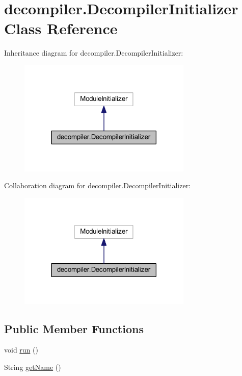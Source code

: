 \hypertarget{classdecompiler_1_1_decompiler_initializer}{}\section{decompiler.\+Decompiler\+Initializer Class Reference}
\label{classdecompiler_1_1_decompiler_initializer}


Inheritance diagram for decompiler.\+Decompiler\+Initializer\+:
\nopagebreak
\begin{figure}[H]
\begin{center}
\leavevmode
\includegraphics[width=234pt]{classdecompiler_1_1_decompiler_initializer__inherit__graph}
\end{center}
\end{figure}


Collaboration diagram for decompiler.\+Decompiler\+Initializer\+:
\nopagebreak
\begin{figure}[H]
\begin{center}
\leavevmode
\includegraphics[width=234pt]{classdecompiler_1_1_decompiler_initializer__coll__graph}
\end{center}
\end{figure}
\subsection*{Public Member Functions}
\begin{DoxyCompactItemize}
\item 
void \mbox{\hyperlink{classdecompiler_1_1_decompiler_initializer_acfc614400e06de7d55d4a07f6ec4af82}{run}} ()
\item 
String \mbox{\hyperlink{classdecompiler_1_1_decompiler_initializer_afda51c6992d7f8d8a172180910e3db26}{get\+Name}} ()
\end{DoxyCompactItemize}


